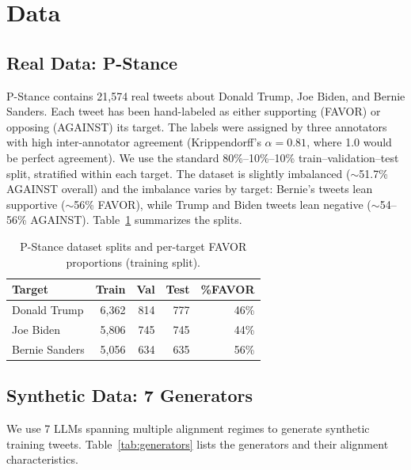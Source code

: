 \documentclass[11pt]{article}
\begin{document}
\section{Data}

\subsection{Real Data: P-Stance}
P-Stance \citep{li2021pstance} contains 21{,}574 real tweets about Donald Trump, Joe Biden, and Bernie Sanders. Each tweet has been hand-labeled as either supporting (FAVOR) or opposing (AGAINST) its target. The labels were assigned by three annotators with high inter-annotator agreement (Krippendorff's $\alpha = 0.81$, where 1.0 would be perfect agreement). We use the standard 80\%--10\%--10\% train--validation--test split, stratified within each target. The dataset is slightly imbalanced ($\sim$51.7\% AGAINST overall) and the imbalance varies by target: Bernie's tweets lean supportive ($\sim$56\% FAVOR), while Trump and Biden tweets lean negative ($\sim$54--56\% AGAINST). Table~\ref{tab:pstance} summarizes the splits.

\begin{table}[t]
\centering
\small
\begin{tabular}{lrrrr}
\toprule
\textbf{Target} & \textbf{Train} & \textbf{Val} & \textbf{Test} & \textbf{\%FAVOR} \\
\midrule
Donald Trump   & 6{,}362 & 814 & 777 & 46\% \\
Joe Biden      & 5{,}806 & 745 & 745 & 44\% \\
Bernie Sanders & 5{,}056 & 634 & 635 & 56\% \\
\bottomrule
\end{tabular}
\caption{P-Stance dataset splits and per-target FAVOR proportions (training split).}
\label{tab:pstance}
\end{table}

\subsection{Synthetic Data: 7 Generators}
We use 7 LLMs spanning multiple alignment regimes to generate synthetic training tweets. Table~\ref{tab:generators} lists the generators and their alignment characteristics.
\end{document}

